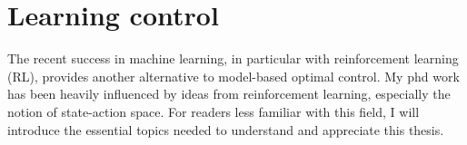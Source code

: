 
\section{Learning control}

The recent success in machine learning, in particular with reinforcement learning (RL), provides another alternative to model-based optimal control. My phd work has been heavily influenced by ideas from reinforcement learning, especially the notion of state-action space. For readers less familiar with this field, I will introduce the essential topics needed to understand and appreciate this thesis.

